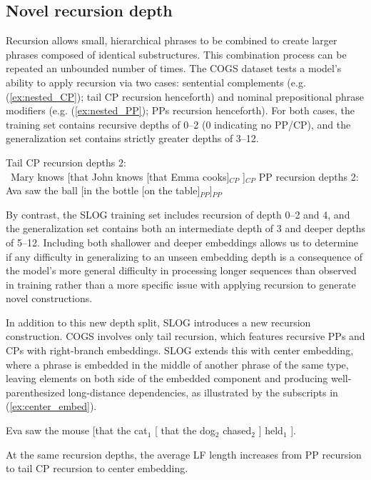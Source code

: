 \subsection{Novel recursion depth} \label{subsec:cat_recur}
Recursion allows small, hierarchical phrases to be combined to create larger phrases composed of identical substructures. This combination process can be repeated an unbounded number of times. The COGS dataset tests a model's ability to apply recursion via two cases: sentential complements (e.g. (\ref{ex:nested_CP}); tail \ac{CP} recursion henceforth) and nominal prepositional phrase modifiers (e.g. (\ref{ex:nested_PP}); PPs recursion henceforth). For both cases, the training set
contains recursive depths of 0--2 (0 indicating no PP/CP), and the generalization set
contains strictly greater depths of 3--12.
\begin{exe}
    \ex \label{ex:nested_CP} Tail CP recursion depths 2: 
    \vspace{0.1cm} \\
    \ Mary knows [that John knows [that Emma cooks]$_{CP}$ ]$_{CP}$ 
    \ex \label{ex:nested_PP} PP recursion depths 2: 
    \vspace{0.1cm} \\
    Ava saw the ball [in the bottle [on the table]$_{PP}$]$_{PP}$
\end{exe}

By contrast, the SLOG training set includes recursion of depth 0--2 and 4, and the generalization set contains both an intermediate depth of 3 and deeper depths of 5--12. Including both shallower and deeper embeddings allows us to determine if any difficulty in generalizing to an unseen embedding depth is a consequence of the model's more general difficulty in processing longer sequences than observed in training \citep{lake2018generalization,herzig2021unlocking,anil2022exploring} rather than a more specific issue with applying recursion to generate novel constructions.

In addition to this new depth split, SLOG introduces a new recursion construction. 
COGS involves only tail recursion, which features recursive PPs and CPs with right-branch embeddings. SLOG extends this with center embedding, where a phrase is embedded in the middle of another phrase of the same type, leaving elements on both side of the embedded component and producing well-parenthesized long-distance dependencies, as illustrated by the subscripts in (\ref{ex:center_embed}).

\begin{exe}
    \ex \label{ex:center_embed}  Eva saw the mouse [that the cat$_1$ [ that the dog$_2$  chased$_2$ ] held$_1$ ].
\end{exe}
\noindent At the same recursion depths, the average LF length increases from PP recursion to tail CP recursion to center embedding. 


